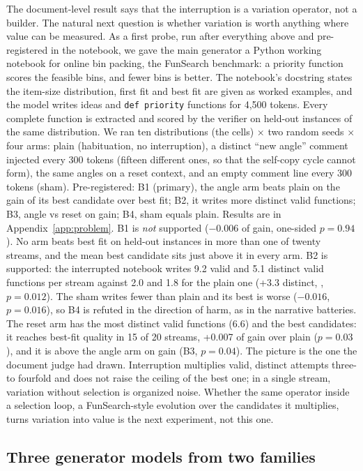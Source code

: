 The document-level result says that the interruption is a variation
operator, not a builder. The natural next question is whether variation is
worth anything where value can be measured. As a first probe, run after
everything above and pre-registered in the notebook, we gave the main
generator a Python working notebook for online bin packing, the FunSearch
benchmark: a priority function scores the feasible bins, and fewer bins is
better. The notebook's docstring states the item-size distribution, first
fit and best fit are given as worked examples, and the model writes ideas
and \texttt{def priority} functions for 4,500 tokens. Every complete
function is extracted and scored by the verifier on held-out instances of
the same distribution. We ran ten distributions (the cells) $\times$ two
random seeds $\times$ four arms: plain (habituation, no interruption), a
distinct ``new angle'' comment injected every 300 tokens (fifteen different
ones, so that the self-copy cycle cannot form), the same angles on a reset
context, and an empty comment line every 300 tokens (sham). Pre-registered:
B1 (primary), the angle arm beats plain on the gain of its best candidate
over best fit; B2, it writes more distinct valid functions; B3, angle vs
reset on gain; B4, sham equals plain. Results are in
Appendix~\ref{app:problem}. B1 is \emph{not} supported ($-0.006$
 of gain, one-sided $p=0.94$). No arm beats best fit on
held-out instances in more than one of twenty streams, and the mean best
candidate sits just above it in every arm. B2 is supported: the interrupted
notebook writes 9.2 valid and 5.1 distinct valid functions per stream
against 2.0 and 1.8 for the plain one (+3.3 distinct, ,
$p=0.012$). The sham writes fewer than plain and its best is worse
($-0.016$, $p=0.016$), so B4 is refuted in the direction of harm, as in the
narrative batteries. The reset arm has the most distinct valid functions
(6.6) and the best candidates: it reaches best-fit quality in 15 of 20
streams, +0.007 of gain over plain ($p=0.03$), and it is above the angle arm
on gain (B3, $p=0.04$). The picture is the one the document judge had drawn.
Interruption multiplies valid, distinct attempts three- to fourfold and does
not raise the ceiling of the best one; in a single stream, variation without
selection is organized noise. Whether the same operator inside a selection
loop, a FunSearch-style evolution over the candidates it multiplies, turns
variation into value is the next experiment, not this one.

\subsection{Three generator models from two families}
\label{sec:families}

